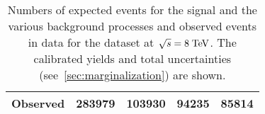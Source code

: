 \begin{table}
\begin{tabular}{ l  rrr  rrr  rrr  rrr }
    \midrule                                                                                                                                                      
    Observed              & \multicolumn{3}{c}{283979}        & \multicolumn{3}{c}{103930}      & \multicolumn{3}{c}{94235}        & \multicolumn{3}{c}{85814}       \\
    \bottomrule
  \end{tabular}
  \caption{
    Numbers of expected events for the \ttbar{} signal and the various background 
    processes and observed events in data for the \ejets{} dataset
    at $\sqrt{s} = 8 \; \mathrm{TeV}{}$.
    The calibrated yields and total uncertainties (see~\ref{sec:marginalization}) are shown.}
  \label{tab:yields2012ele}
\end{table}
